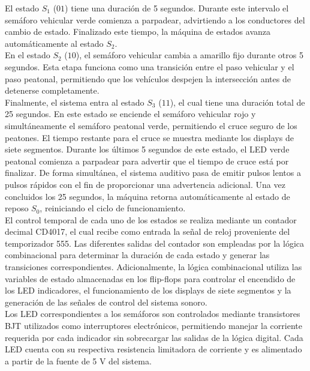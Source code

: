 \documentclass[12pt, journal, onecolumn]{IEEEtran}
\begin{document}
El estado $S_1$ ($01$) tiene una duración de 5 segundos. Durante este intervalo el semáforo vehicular verde comienza a parpadear, advirtiendo a los conductores del cambio de estado. Finalizado este tiempo, la máquina de estados avanza automáticamente al estado $S_2$.\\

En el estado $S_2$ ($10$), el semáforo vehicular cambia a amarillo fijo durante otros 5 segundos. Esta etapa funciona como una transición entre el paso vehicular y el paso peatonal, permitiendo que los vehículos despejen la intersección antes de detenerse completamente.\\

Finalmente, el sistema entra al estado $S_3$ ($11$), el cual tiene una duración total de 25 segundos. En este estado se enciende el semáforo vehicular rojo y simultáneamente el semáforo peatonal verde, permitiendo el cruce seguro de los peatones. El tiempo restante para el cruce se muestra mediante los displays de siete segmentos. Durante los últimos 5 segundos de este estado, el LED verde peatonal comienza a parpadear para advertir que el tiempo de cruce está por finalizar. De forma simultánea, el sistema auditivo pasa de emitir pulsos lentos a pulsos rápidos con el fin de proporcionar una advertencia adicional. Una vez concluidos los 25 segundos, la máquina retorna automáticamente al estado de reposo $S_0$, reiniciando el ciclo de funcionamiento.\\

El control temporal de cada uno de los estados se realiza mediante un contador decimal CD4017, el cual recibe como entrada la señal de reloj proveniente del temporizador 555. Las diferentes salidas del contador son empleadas por la lógica combinacional para determinar la duración de cada estado y generar las transiciones correspondientes. Adicionalmente, la lógica combinacional utiliza las variables de estado almacenadas en los flip-flops para controlar el encendido de los LED indicadores, el funcionamiento de los displays de siete segmentos y la generación de las señales de control del sistema sonoro.\\

Los LED correspondientes a los semáforos son controlados mediante transistores BJT utilizados como interruptores electrónicos, permitiendo manejar la corriente requerida por cada indicador sin sobrecargar las salidas de la lógica digital. Cada LED cuenta con su respectiva resistencia limitadora de corriente y es alimentado a partir de la fuente de 5 V del sistema.\\
\end{document}
